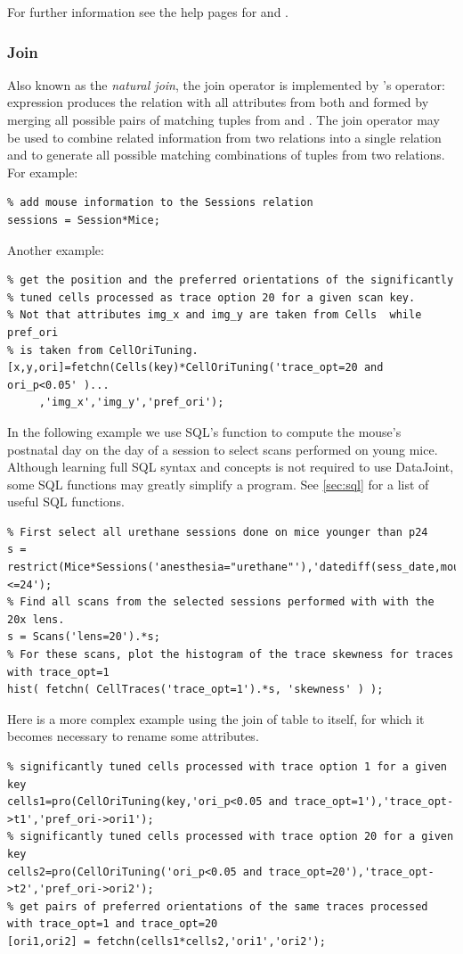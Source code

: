 \documentclass[10pt]{article}
\begin{document}
For further information see the help pages for  and .

\subsubsection{Join}\label{sec:join}
Also known as the {\em natural join}, the join operator is implemented by 's  operator: expression  produces the relation with all attributes from both  and  formed by merging all possible pairs of matching tuples from  and . The join operator may be used to combine related information from two relations into a single relation and to generate all possible matching combinations of tuples from two relations. For example:

\begin{lstlisting}
% add mouse information to the Sessions relation
sessions = Session*Mice;
\end{lstlisting}

Another example:
\begin{lstlisting}
% get the position and the preferred orientations of the significantly 
% tuned cells processed as trace option 20 for a given scan key.
% Not that attributes img_x and img_y are taken from Cells  while pref_ori 
% is taken from CellOriTuning. 
[x,y,ori]=fetchn(Cells(key)*CellOriTuning('trace_opt=20 and ori_p<0.05' )...
     ,'img_x','img_y','pref_ori');
\end{lstlisting} 

In the following example we use SQL's  function to compute the mouse's postnatal day on the day of a session to select scans performed on young mice.  Although learning full SQL syntax and concepts is not required to use DataJoint, some SQL functions may greatly simplify a program. See \autoref{sec:sql} for a list of useful SQL functions.

\begin{lstlisting}
% First select all urethane sessions done on mice younger than p24
s = restrict(Mice*Sessions('anesthesia="urethane"'),'datediff(sess_date,mouse_dob)<=24');  
% Find all scans from the selected sessions performed with with the 20x lens.
s = Scans('lens=20').*s;
% For these scans, plot the histogram of the trace skewness for traces with trace_opt=1
hist( fetchn( CellTraces('trace_opt=1').*s, 'skewness' ) ); 
\end{lstlisting}   

Here is a more complex example using the join of table to itself, for which it becomes necessary to rename some attributes.
\begin{lstlisting}
% significantly tuned cells processed with trace option 1 for a given key
cells1=pro(CellOriTuning(key,'ori_p<0.05 and trace_opt=1'),'trace_opt->t1','pref_ori->ori1');
% significantly tuned cells processed with trace option 20 for a given key
cells2=pro(CellOriTuning('ori_p<0.05 and trace_opt=20'),'trace_opt->t2','pref_ori->ori2'); 
% get pairs of preferred orientations of the same traces processed with trace_opt=1 and trace_opt=20 
[ori1,ori2] = fetchn(cells1*cells2,'ori1','ori2');
\end{lstlisting}
\end{document}
